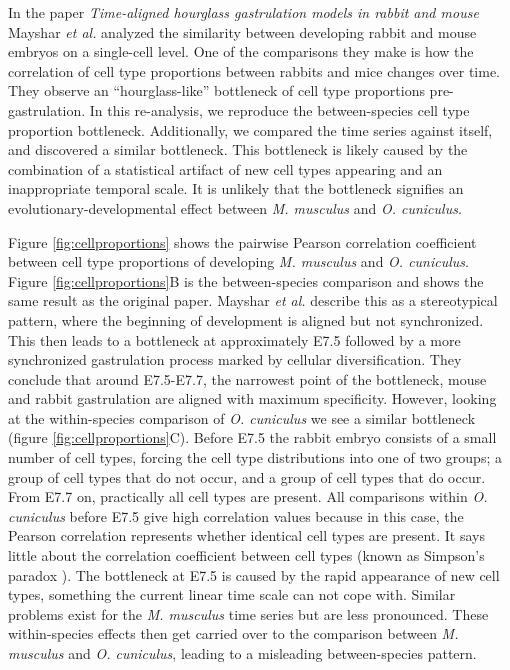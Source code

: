 In the paper \textit{Time-aligned hourglass gastrulation models in rabbit and mouse}\cite{Mayshar2023} Mayshar \textit{et al.} analyzed the similarity between developing rabbit and mouse embryos on a single-cell level. One of the comparisons they make is how the correlation of cell type proportions between rabbits and mice changes over time. They observe an ``hourglass-like'' bottleneck of cell type proportions pre-gastrulation. In this re-analysis, we reproduce the between-species cell type proportion bottleneck. Additionally, we compared the time series against itself, and discovered a similar bottleneck. This bottleneck is likely caused by the combination of a statistical artifact of new cell types appearing and an inappropriate temporal scale. It is unlikely that the bottleneck signifies an evolutionary-developmental effect between \textit{M. musculus} and \textit{O. cuniculus}.

Figure \ref{fig:cellproportions} shows the pairwise Pearson correlation coefficient between cell type proportions of developing \textit{M. musculus} and \textit{O. cuniculus}. Figure \ref{fig:cellproportions}B is the between-species comparison and shows the same result as the original paper. Mayshar \textit{et al.} describe this as a stereotypical pattern, where the beginning of development is aligned but not synchronized. This then leads to a bottleneck at approximately E7.5 followed by a more synchronized gastrulation process marked by cellular diversification. They conclude that around E7.5-E7.7, the narrowest point of the bottleneck, mouse and rabbit gastrulation are aligned with maximum specificity. However, looking at the within-species comparison of \textit{O. cuniculus} we see a similar bottleneck (figure \ref{fig:cellproportions}C). Before E7.5 the rabbit embryo consists of a small number of cell types, forcing the cell type distributions into one of two groups; a group of cell types that do not occur, and a group of cell types that do occur. From E7.7 on, practically all cell types are present. All comparisons within \textit{O. cuniculus} before E7.5 give high correlation values because in this case, the Pearson correlation represents whether identical cell types are present. It says little about the correlation coefficient between cell types (known as Simpson's paradox \cite{Saccenti2023}). The bottleneck at E7.5 is caused by the rapid appearance of new cell types, something the current linear time scale can not cope with. Similar problems exist for the \textit{M. musculus} time series but are less pronounced. These within-species effects then get carried over to the comparison between \textit{M. musculus} and \textit{O. cuniculus}, leading to a misleading between-species pattern.


